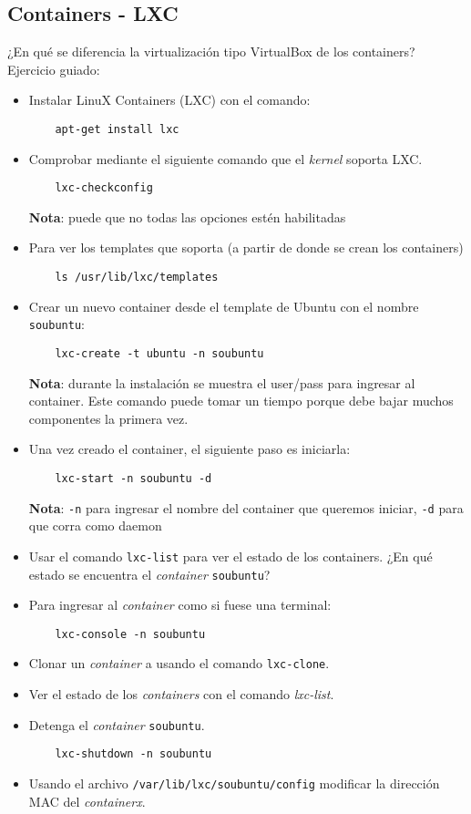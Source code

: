 \subsection{Containers - LXC}
\begin{questions}
\question ¿En qué se diferencia la virtualización tipo VirtualBox de los containers?
\question Ejercicio guiado:

\begin{itemize}
\item Instalar LinuX Containers (LXC) con el comando:
\begin{verbatim}
  	apt-get install lxc
\end{verbatim}
\item Comprobar mediante el siguiente comando que el \textit{kernel} soporta LXC.
\begin{verbatim}
  	lxc-checkconfig
\end{verbatim}
  \textbf{Nota}: puede que no todas las opciones estén habilitadas
\item Para ver los templates que soporta (a partir de donde se crean los containers)
\begin{verbatim}
  	ls /usr/lib/lxc/templates
\end{verbatim}
\item Crear un nuevo container desde el template de Ubuntu con el nombre
  \texttt{soubuntu}:
\begin{verbatim}
  	lxc-create -t ubuntu -n soubuntu
\end{verbatim}
  \textbf{Nota}: durante la instalación se muestra el user/pass para
  ingresar al container. Este comando puede tomar un tiempo porque debe
  bajar muchos componentes la primera vez.
\item Una vez creado el container, el siguiente paso es iniciarla:
\begin{verbatim}
  	lxc-start -n soubuntu -d
\end{verbatim}
  \textbf{Nota}: \texttt{-n} para ingresar el nombre del container que
  queremos iniciar, \texttt{-d} para que corra como daemon
\item Usar el comando \texttt{lxc-list} para ver el estado de los
  containers. ¿En qué estado se encuentra el \textit{container}
  \texttt{soubuntu}?
\item Para ingresar al \textit{container} como si fuese una terminal:
\begin{verbatim}
  	lxc-console -n soubuntu
\end{verbatim}
  
\item Clonar un \textit{container} a usando el comando \texttt{lxc-clone}.
\item Ver el estado de los \textit{containers} con el comando
  \textit{lxc-list}.
\item Detenga el \textit{container} \texttt{soubuntu}.
\begin{verbatim}
  	lxc-shutdown -n soubuntu
\end{verbatim}
\item Usando el archivo \texttt{/var/lib/lxc/soubuntu/config} modificar la
  dirección MAC del \textit{containerx}.


\end{itemize}
\end{questions}
